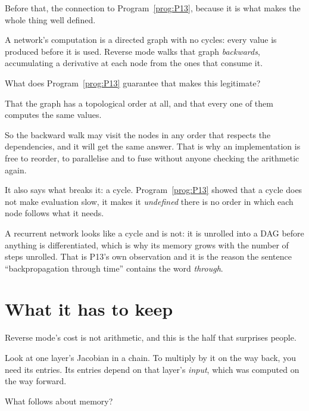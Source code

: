 \begin{fr}
Before that, the connection to Program~\ref{prog:P13}, because it is what
makes the whole thing well defined.

A network's computation is a directed graph with no cycles: every value is
produced before it is used. Reverse mode walks that graph \emph{backwards},
accumulating a derivative at each node from the ones that consume it.

What does Program~\ref{prog:P13} guarantee that makes this legitimate?
\nextframe
\end{fr}

\begin{fr}
\begin{ansblock}
That the graph has a topological order at all, and that every one of them
computes the same values.
\end{ansblock}

So the backward walk may visit the nodes in any order that respects the
dependencies, and it will get the same answer. That is why an implementation
is free to reorder, to parallelise and to fuse without anyone checking the
arithmetic again.

\begin{note}
It also says what breaks it: a cycle. Program~\ref{prog:P13} showed that a
cycle does not make evaluation slow, it makes it \emph{undefined} \dash{}
there is no order in which each node follows what it needs.

A recurrent network looks like a cycle and is not: it is unrolled into a DAG
before anything is differentiated, which is why its memory grows with the
number of steps unrolled. That is P13's own observation and it is the reason
the sentence \enquote{backpropagation through time} contains the word
\emph{through}.
\end{note}
\end{fr}

\section{What it has to keep}
\label{sec:P16-memory}

\begin{fr}
Reverse mode's cost is not arithmetic, and this is the half that surprises
people.

Look at one layer's Jacobian in a chain. To multiply by it on the way back,
you need its entries. Its entries depend on that layer's \emph{input}, which
was computed on the way forward.

What follows about memory?
\dotline
\nextframe
\end{fr}

